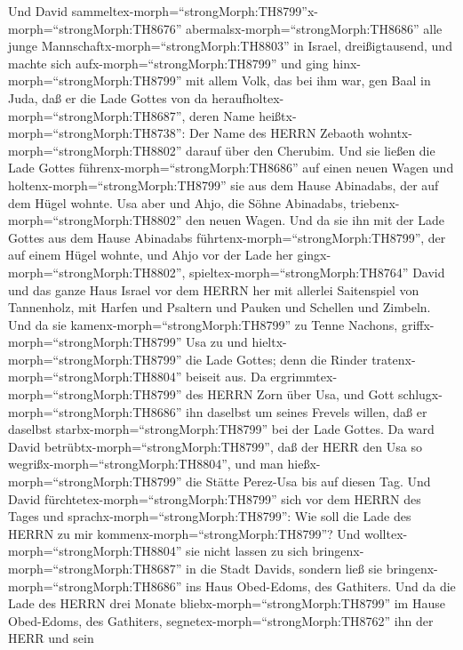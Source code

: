  Und David
sammeltex-morph=``strongMorph:TH8799''\textbar x-morph=``strongMorph:TH8676''
abermalsx-morph=``strongMorph:TH8686'' alle junge
Mannschaftx-morph=``strongMorph:TH8803'' in Israel, dreißigtausend,
 und machte sich aufx-morph=``strongMorph:TH8799'' und ging
hinx-morph=``strongMorph:TH8799'' mit allem Volk, das bei ihm war, gen
Baal in Juda, daß er die Lade Gottes von da
heraufholtex-morph=``strongMorph:TH8687'', deren Name
heißtx-morph=``strongMorph:TH8738'': Der Name des HERRN Zebaoth
wohntx-morph=``strongMorph:TH8802'' darauf über den Cherubim.
 Und sie ließen die Lade Gottes
führenx-morph=``strongMorph:TH8686'' auf einen neuen Wagen und
holtenx-morph=``strongMorph:TH8799'' sie aus dem Hause Abinadabs, der
auf dem Hügel wohnte. Usa aber und Ahjo, die Söhne Abinadabs,
triebenx-morph=``strongMorph:TH8802'' den neuen Wagen.  Und
da sie ihn mit der Lade Gottes aus dem Hause Abinadabs
führtenx-morph=``strongMorph:TH8799'', der auf einem Hügel wohnte, und
Ahjo vor der Lade her gingx-morph=``strongMorph:TH8802'', 
spieltex-morph=``strongMorph:TH8764'' David und das ganze Haus Israel
vor dem HERRN her mit allerlei Saitenspiel von Tannenholz, mit Harfen
und Psaltern und Pauken und Schellen und Zimbeln.  Und da
sie kamenx-morph=``strongMorph:TH8799'' zu Tenne Nachons,
griffx-morph=``strongMorph:TH8799'' Usa zu und
hieltx-morph=``strongMorph:TH8799'' die Lade Gottes; denn die Rinder
tratenx-morph=``strongMorph:TH8804'' beiseit aus.  Da
ergrimmtex-morph=``strongMorph:TH8799'' des HERRN Zorn über Usa, und
Gott schlugx-morph=``strongMorph:TH8686'' ihn daselbst um seines Frevels
willen, daß er daselbst starbx-morph=``strongMorph:TH8799'' bei der Lade
Gottes.  Da ward David
betrübtx-morph=``strongMorph:TH8799'', daß der HERR den Usa so
wegrißx-morph=``strongMorph:TH8804'', und man
hießx-morph=``strongMorph:TH8799'' die Stätte Perez-Usa bis auf diesen
Tag.  Und David fürchtetex-morph=``strongMorph:TH8799'' sich
vor dem HERRN des Tages und sprachx-morph=``strongMorph:TH8799'': Wie
soll die Lade des HERRN zu mir kommenx-morph=``strongMorph:TH8799''?
 Und wolltex-morph=``strongMorph:TH8804'' sie nicht lassen
zu sich bringenx-morph=``strongMorph:TH8687'' in die Stadt Davids,
sondern ließ sie bringenx-morph=``strongMorph:TH8686'' ins Haus
Obed-Edoms, des Gathiters.  Und da die Lade des HERRN drei
Monate bliebx-morph=``strongMorph:TH8799'' im Hause Obed-Edoms, des
Gathiters, segnetex-morph=``strongMorph:TH8762'' ihn der HERR und sein
